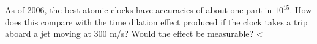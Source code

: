 As of 2006, the best atomic clocks have accuracies of about one part
in $10^{15}$. How does this compare with the time dilation effect
produced if the clock takes a trip aboard a jet moving at
300 m/s? Would the effect be measurable?
<%
